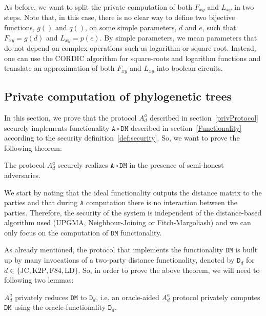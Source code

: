 As before, we want to split the private computation of both $F_{xy}$ and $L_{xy}$ in two steps. Note that, in this case, there is no clear way to define two bijective functions, $g()$ and $q()$, on some simple parameters, $d$ and $e$, such that $F_{xy} = g(d)$ and $L_{xy} = p(e)$. By simple parameters, we mean parameters that do not depend on complex operations such as logarithm or square root. Instead, one can use the CORDIC algorithm \cite{V59, Songhori2019} for square-roots and logarithm functions and translate an approximation of both $F_{xy}$ and $L_{xy}$ into boolean circuits.



\subsection{Private computation of phylogenetic trees}

In this section, we prove that the protocol $A^a_d$ described in section~\ref{privProtocol} securely implements functionality $\mathtt{A}\circ \mathtt{DM}$ described in section~\ref{Functionality} according to the security definition~\ref{def:security}. So, we want to prove the following theorem:

\begin{theorem}
The protocol $A^a_d$ securely realizes $\mathtt{A}\circ \mathtt{DM}$ in the presence of semi-honest adversaries.
\end{theorem}

We start by noting that the ideal functionality outputs the distance matrix to the parties and that during $\mathtt{A}$ computation there is no interaction between the parties. Therefore, the security of the system is independent of the distance-based algorithm used (UPGMA, Neighbour-Joining or Fitch-Margoliash) and we can only focus on the computation of $\mathtt{DM}$ functionality.

As already mentioned, the protocol that implements the functionality $\mathtt{DM}$ is built up by many invocations of a two-party distance functionality, denoted by $\mathtt{D}_d$ for $d\in\{\text{JC}, \text{K2P}, \text{F84}, \text{LD}\}$. So, in order to prove the above theorem, we will need to following two lemmas:

\begin{lemma}\label{firstlemma}
$A^a_d$ privately reduces $\mathtt{DM}$ to $\mathtt{D}_d$, i.e. an oracle-aided $A^a_d$ protocol privately computes $\mathtt{DM}$ using the oracle-functionality $\mathtt{D}_d$.
\end{lemma}

